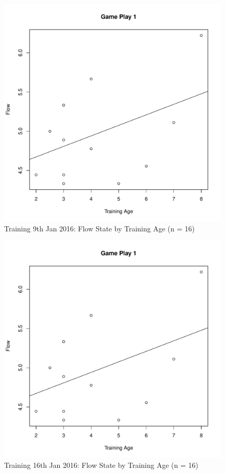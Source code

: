 \begin{CJK}{UTF8}{gbsn}
\begin{figure}[htbp]
  \centering
\includegraphics[scale=.5]{images/flow0109TrainingAge.pdf}
  \caption{Training 9th Jan 2016: Flow State by Training Age (n = 16)}
  \label{fig:flow0109TrainingAge}
\end{figure}

\begin{figure}[htbp]
  \centering
\includegraphics[scale=.5]{images/flow0109TrainingAge.pdf}
  \caption{Training 16th Jan 2016: Flow State by Training Age (n = 16)}
  \label{fig:flow0109TrainingAge}
\end{figure}



\end{CJK}

